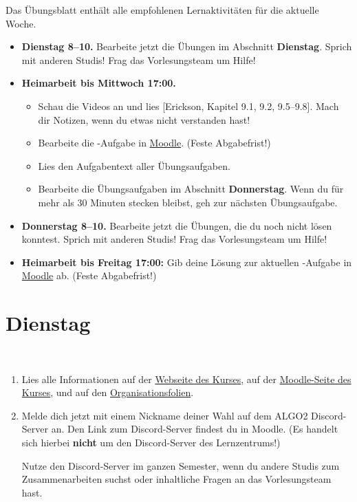 \documentclass{uebung_cs}
\begin{document}
Das Übungsblatt enthält alle empfohlenen Lernaktivitäten für die aktuelle Woche.

\begin{itemize}
\item \textbf{Dienstag 8--10.} Bearbeite jetzt die Übungen im Abschnitt \textbf{Dienstag}. Sprich mit anderen Studis! Frag das Vorlesungsteam um Hilfe!
\item \textbf{Heimarbeit bis Mittwoch 17:00.}
\begin{itemize}
\item 
Schau die Videos an und lies [Erickson, Kapitel 9.1, 9.2, 9.5--9.8]. Mach dir Notizen, wenn du etwas nicht verstanden hast!
\item Bearbeite die -Aufgabe in \href{https://moodle.studiumdigitale.uni-frankfurt.de/moodle/course/view.php?id=2241}{Moodle}. (Feste Abgabefrist!)
\item Lies den Aufgabentext aller Übungsaufgaben.
\item Bearbeite die Übungsaufgaben im Abschnitt \textbf{Donnerstag}. Wenn du für mehr als 30 Minuten stecken bleibst, geh zur nächsten Übungsaufgabe.
\end{itemize}
\item \textbf{Donnerstag 8--10.} Bearbeite jetzt die Übungen, die du noch nicht lösen konntest. Sprich mit anderen Studis! Frag das Vorlesungsteam um Hilfe!
\item \textbf{Heimarbeit bis Freitag 17:00:} Gib deine Lösung zur aktuellen -Aufgabe in \href{https://moodle.studiumdigitale.uni-frankfurt.de/moodle/course/view.php?id=2241}{Moodle} ab. (Feste Abgabefrist!)
\end{itemize}

\section*{Dienstag}

\begin{aufgabe}[Orga]\
  \begin{enumerate}
    \item Lies alle Informationen auf der \href{https://tcs.uni-frankfurt.de/algo2/}{Webseite des Kurses}, auf der \href{https://moodle.studiumdigitale.uni-frankfurt.de/moodle/course/view.php?id=2241}{Moodle-Seite des Kurses}, und auf den \href{https://tcs.uni-frankfurt.de/algo2/ALGO2-Organisation.pdf}{Organisationsfolien}.
    \item Melde dich jetzt mit einem Nickname deiner Wahl auf dem ALGO2 Discord-Server an. Den Link zum Discord-Server findest du in Moodle. (Es handelt sich hierbei \textbf{nicht} um den Discord-Server des Lernzentrums!)

    Nutze den Discord-Server im ganzen Semester, wenn du andere Studis zum Zusammenarbeiten suchst oder inhaltliche Fragen an das Vorlesungsteam hast.
  \end{enumerate}
\end{aufgabe}
\end{document}
